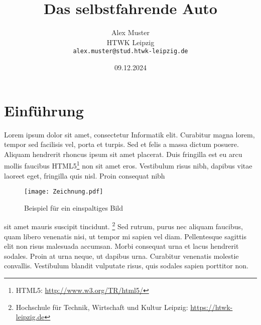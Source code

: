 \documentclass[a4paper,10pt,parskip,twocolumn]{article}
\title{Das selbstfahrende Auto}
\author{
	\Large Alex Muster \\[2mm]
	\normalsize HTWK Leipzig \\
	\texttt{alex.muster@stud.htwk-leipzig.de}
}
\date{09.12.2024}
\begin{document}




\section{Einführung}

Lorem ipsum dolor sit amet, consectetur Informatik elit. Curabitur magna lorem, tempor sed facilisis vel, porta et turpis. Sed et felis a massa dictum posuere. Aliquam hendrerit rhoncus \cite{hitzler_semantic_2008} ipsum sit amet placerat. Duis fringilla est eu arcu mollis faucibus HTML5\footnote{HTML5: \url{http://www.w3.org/TR/html5/}} non sit amet eros. Vestibulum risus nibh, dapibus vitae laoreet eget, fringilla quis nisl. Proin consequat nibh  

\begin{figure}[bt]
	\centering
	\texttt{[image: Zeichnung.pdf]}
	\caption{Beispiel für ein einspaltiges Bild}
	\label{bild1}
\end{figure}

sit amet mauris suscipit tincidunt. \footnote{Hochschule für Technik, Wirtschaft und Kultur Leipzig: \url{https://htwk-leipzig.de}}  Sed rutrum, purus nec aliquam faucibus, quam libero venenatis nisi, ut tempor mi sapien vel diam. Pellentesque sagittis elit non risus malesuada accumsan. Morbi consequat urna et lacus hendrerit sodales. Proin at urna neque, ut dapibus urna. Curabitur venenatis molestie convallis. Vestibulum blandit vulputate risus, quis sodales sapien porttitor non.
\end{document}
